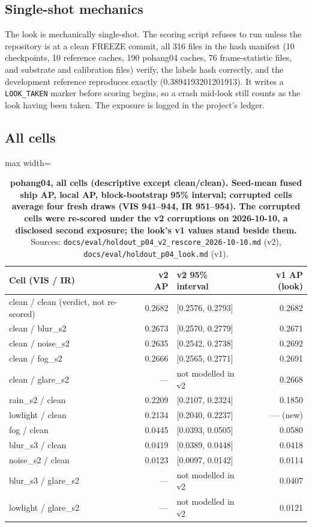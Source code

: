 \documentclass[10pt]{article}
\begin{document}
\subsection{Single-shot mechanics}\label{app:K.1}
The look is mechanically single-shot. The scoring script refuses to run unless the repository is at a clean FREEZE commit, all 316 files in the hash manifest (10 checkpoints, 10 reference caches, 190 pohang04 caches, 76 frame-statistic files, and substrate and calibration files) verify, the labels hash correctly, and the development reference reproduces exactly (0.3894193201201913). It writes a \texttt{LOOK\_\allowbreak{}TAKEN} marker before scoring begins, so a crash mid-look still counts as the look having been taken. The exposure is logged in the project's ledger.

\subsection{All cells}\label{app:K.2}
\begin{table}[htbp]
\centering
\small
\caption{\textbf{pohang04, all cells (descriptive except clean/clean). Seed-mean fused ship AP, local AP, block-bootstrap 95\% interval; corrupted cells average four fresh draws (VIS 941--944, IR 951--954). The corrupted cells were re-scored under the v2 corruptions on 2026-10-10, a disclosed second exposure; the look's v1 values stand beside them.} Sources: \texttt{docs/\allowbreak{}eval/\allowbreak{}holdout\_\allowbreak{}p04\_\allowbreak{}v2\_\allowbreak{}rescore\_\allowbreak{}2026-10-10.md} (v2), \texttt{docs/\allowbreak{}eval/\allowbreak{}holdout\_\allowbreak{}p04\_\allowbreak{}look.md} (v1).}
\label{tab:7}
\begin{adjustbox}{max width=\linewidth}
\begin{tabular}{lrlr}
\toprule
Cell (VIS / IR) & v2 AP & v2 95\% interval & v1 AP (look) \\
\midrule
clean / clean (verdict, not re-scored) & 0.2682 & [0.2576, 0.2793] & 0.2682 \\
clean / blur\_s2 & 0.2673 & [0.2570, 0.2779] & 0.2671 \\
clean / noise\_s2 & 0.2635 & [0.2542, 0.2738] & 0.2692 \\
clean / fog\_s2 & 0.2666 & [0.2565, 0.2771] & 0.2691 \\
clean / glare\_s2 & --- & not modelled in v2 & 0.2668 \\
rain\_s2 / clean & 0.2209 & [0.2107, 0.2324] & 0.1850 \\
lowlight / clean & 0.2134 & [0.2040, 0.2237] & --- (new) \\
fog / clean & 0.0445 & [0.0393, 0.0505] & 0.0580 \\
blur\_s3 / clean & 0.0419 & [0.0389, 0.0448] & 0.0418 \\
noise\_s2 / clean & 0.0123 & [0.0097, 0.0142] & 0.0114 \\
blur\_s3 / glare\_s2 & --- & not modelled in v2 & 0.0407 \\
lowlight / glare\_s2 & --- & not modelled in v2 & 0.0121 \\
\bottomrule
\end{tabular}
\end{adjustbox}
\end{table}
\end{document}

